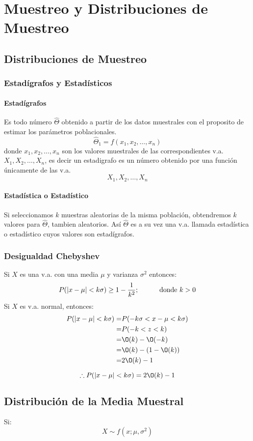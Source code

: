 \chapter{Muestreo y Distribuciones de Muestreo}
\section{Distribuciones de Muestreo}
\subsection{Estadígrafos y Estadísticos}
\subsubsection*{Estadígrafos}
Es todo número $\widehat{\Theta}$ obtenido a partir de los datos muestrales con el proposito de estimar los parámetros poblacionales.
$$ \widehat{\Theta}_1 = f(x_1,x_2,\ldots,x_n)$$
donde $x_1,x_2,\ldots,x_n$ son los valores muestrales de las correspondientes v.a. $X_1,X_2,\ldots,X_n$, es decir un estadigrafo es un número obtenido por una función únicamente de las v.a.
$$X_1,X_2,\ldots,X_n$$
\subsubsection*{Estadística o Estadístico}
Si seleccionamos $k$ muestras aleatorias de la misma población, obtendremos $k$ valores para $\widehat{\Theta}$, tambien aleatorios. Así $\widehat{\Theta}$ es a su vez una v.a. llamada estadística o estadístico cuyos valores son estadígrafos.
\subsection{Desigualdad Chebyshev}
Si $X$ es una v.a. con una media $\mu$ y varianza $\sigma^2$ entonces:
$$ P(|x-\mu| < k\sigma ) \geq 1 - \dfrac{1}{k^2} \text{;\hspace{1cm} donde $k>0$}$$
Si $X$ es v.a. normal, entonces:
\begin{align*}
P(|x-\mu| < k\sigma ) = & P( -k\sigma < x-\mu < k\sigma ) \\
			    =  &   P( -k < z < k ) \\
			     = & \O(k)- \O(-k) \\
			      =&\O(k) - (1-\O(k))\\
			      =& 2\O(k) -1
\end{align*}

$$\therefore P(|x-\mu| < k\sigma ) = 2\O(k)-1$$
\section{Distribución de la Media Muestral}
Si:
$$X \sim f(x;\mu,\sigma^2)$$

